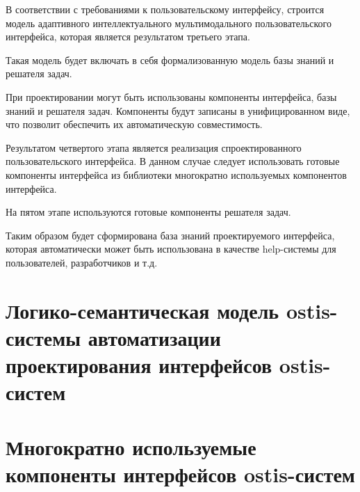 
В соответствии с требованиями к пользовательскому интерфейсу, строится модель адаптивного интеллектуального мультимодального пользовательского интерфейса, которая является результатом третьего этапа.

Такая модель будет включать в себя формализованную модель базы знаний и решателя задач.

При проектировании могут быть использованы компоненты интерфейса, базы знаний и решателя задач. 
Компоненты будут записаны в унифицированном виде,
что позволит обеспечить их автоматическую совместимость.


Результатом четвертого этапа является реализация спроектированного пользовательского интерфейса. В данном случае следует использовать готовые компоненты интерфейса из библиотеки многократно используемых компонентов интерфейса.


На пятом этапе используются готовые компоненты решателя задач.


Таким образом будет сформирована база знаний проектируемого интерфейса, которая автоматически может быть использована в качестве help-системы для пользователей, разработчиков и т.д.


\section{Логико-семантическая модель ostis-системы автоматизации проектирования интерфейсов ostis-систем}
\section{Многократно используемые компоненты интерфейсов ostis-систем}

%